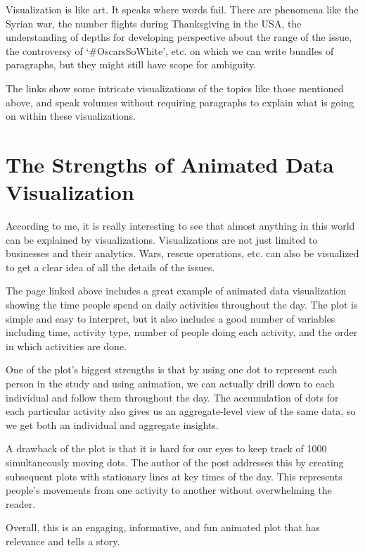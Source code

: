 \documentclass[]{book}
\theoremstyle{definition}
\theoremstyle{definition}
\theoremstyle{definition}
\theoremstyle{remark}
\begin{document}
Visualization is like art. It speaks where words fail. There are
phenomena like the Syrian war, the number flights during Thanksgiving in
the USA, the understanding of depths for developing perspective about
the range of the issue, the controversy of `\#OscarsSoWhite', etc. on
which we can write bundles of paragraphs, but they might still have
scope for ambiguity.

The links show some intricate visualizations of the topics like those
mentioned above, and speak volumes without requiring paragraphs to
explain what is going on within these visualizations.

\section{The Strengths of Animated Data
Visualization}\label{the-strengths-of-animated-data-visualization}

\citep{American_life} According to me, it is really interesting to see
that almost anything in this world can be explained by visualizations.
Visualizations are not just limited to businesses and their analytics.
Wars, rescue operations, etc. can also be visualized to get a clear idea
of all the details of the issues.

The page linked above includes a great example of animated data
visualization showing the time people spend on daily activities
throughout the day. The plot is simple and easy to interpret, but it
also includes a good number of variables including time, activity type,
number of people doing each activity, and the order in which activities
are done.

One of the plot's biggest strengths is that by using one dot to
represent each person in the study and using animation, we can actually
drill down to each individual and follow them throughout the day. The
accumulation of dots for each particular activity also gives us an
aggregate-level view of the same data, so we get both an individual and
aggregate insights.

A drawback of the plot is that it is hard for our eyes to keep track of
1000 simultaneously moving dots. The author of the post addresses this
by creating subsequent plots with stationary lines at key times of the
day. This represents people's movements from one activity to another
without overwhelming the reader.

Overall, this is an engaging, informative, and fun animated plot that
has relevance and tells a story.
\end{document}
